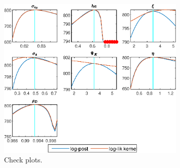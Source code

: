  
\begin{figure}[H]
\centering 
\includegraphics[width=0.80\textwidth]{BRS_growth_KPR_D/graphs/BRS_growth_KPR_D_CheckPlots1}
\caption{Check plots.}\label{Fig:CheckPlots:1}
\end{figure}
 
